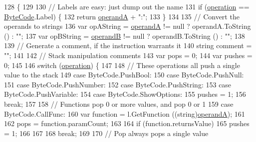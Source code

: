 \begin{DoxyCode}
128                                                       \{
129 
130             \textcolor{comment}{// Labels are easy: just dump out the name}
131             \textcolor{keywordflow}{if} (\hyperlink{a00058_a566bf5f7198cc353ea5c3710cb3a31cb}{operation} == \hyperlink{a00040_ad5dfb6ee68ca7469623ad3e459f98894}{ByteCode}.Label) \{
132                 \textcolor{keywordflow}{return} \hyperlink{a00058_ab5d386faa0d3dbc23db80f8e62706afd}{operandA} + \textcolor{stringliteral}{":"};
133             \}
134 
135             \textcolor{comment}{// Convert the operands to strings}
136             var opAString = \hyperlink{a00058_ab5d386faa0d3dbc23db80f8e62706afd}{operandA} != null ? operandA.ToString () : \textcolor{stringliteral}{""};
137             var opBString = \hyperlink{a00058_a56348c6fe7eb919b7277afc06e5b224a}{operandB} != null ? operandB.ToString () : \textcolor{stringliteral}{""};
138 
139             \textcolor{comment}{// Generate a comment, if the instruction warrants it}
140             \textcolor{keywordtype}{string} comment = \textcolor{stringliteral}{""};
141 
142             \textcolor{comment}{// Stack manipulation comments}
143             var pops = 0;
144             var pushes = 0;
145 
146             \textcolor{keywordflow}{switch} (\hyperlink{a00058_a566bf5f7198cc353ea5c3710cb3a31cb}{operation}) \{
147 
148             \textcolor{comment}{// These operations all push a single value to the stack}
149             \textcolor{keywordflow}{case} ByteCode.PushBool:
150             \textcolor{keywordflow}{case} ByteCode.PushNull:
151             \textcolor{keywordflow}{case} ByteCode.PushNumber:
152             \textcolor{keywordflow}{case} ByteCode.PushString:
153             \textcolor{keywordflow}{case} ByteCode.PushVariable:
154             \textcolor{keywordflow}{case} ByteCode.ShowOptions:
155                 pushes = 1;
156                 \textcolor{keywordflow}{break};
157 
158             \textcolor{comment}{// Functions pop 0 or more values, and pop 0 or 1 }
159             \textcolor{keywordflow}{case} ByteCode.CallFunc:
160                 var \textcolor{keyword}{function} = l.GetFunction ((string)\hyperlink{a00058_ab5d386faa0d3dbc23db80f8e62706afd}{operandA});
161 
162                 pops = function.paramCount;
163 
164                 \textcolor{keywordflow}{if} (\textcolor{keyword}{function}.returnsValue)
165                     pushes = 1;
166                 
167 
168                 \textcolor{keywordflow}{break};
169             
170             \textcolor{comment}{// Pop always pops a single value}

\end{DoxyCode}
